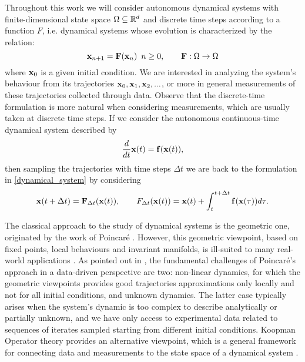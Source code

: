 Throughout this work we will consider autonomous dynamical systems with finite-dimensional state space $\Omega\subseteq\mathbb{R}^d$ and discrete time steps according to a function $F$, i.e. dynamical systems whose evolution is characterized by the relation:
\begin{equation}
    \label{dynamical_system}
    \vb{x}_{n+1} = \vb{F}(\vb{x}_n)\,\,\,n\geq 0, \qquad \vb{F}:\Omega \to \Omega
\end{equation}
where $\vb{x}_0$ is a given initial condition. We are interested in analyzing the system's behaviour from its trajectories $\vb{x}_0, \vb{x}_1, \vb{x}_2,...$, or more in general measurements of these trajectories collected through data. Observe that the discrete-time formulation is more natural when considering measurements, which are usually taken at discrete time steps. If we consider the autonomous continuous-time dynamical system described by
\begin{equation*}
    \frac{d}{dt}\vb{x}(t) = \vb{f}(\vb{x}(t)),
\end{equation*}
then sampling the trajectories with time steps $\Delta t$ we are back to the formulation in \eqref{dynamical_system} by considering
\begin{equation}
    \label{continuous_to_discrete}
    \vb{x}(t+\Delta t) = \vb{F}_{\Delta t}(\vb{x}(t)), \qquad \vb\vb{F}_{\Delta t}(\vb{x}(t)) = \vb{x}(t) + \int_{t}^{t+\Delta t}{\vb{f}(\vb{x}(\tau)) d\tau}.
\end{equation}

The classical approach to the study of dynamical systems is the geometric one, originated by the work of Poincaré \cite{henri_poincare_les_1899}. However, this geometric viewpoint, based on fixed points, local behaviours and invariant manifolds, is ill-suited to many real-world applications \cite{budisic_applied_2012}. As pointed out in \cite{colbrook_rigorous_2021}, the fundamental challenges of Poincaré's approach in a data-driven perspective are two: non-linear dynamics, for which the geometric viewpoints provides good trajectories approximations only locally and not for all initial conditions, and unknown dynamics. The latter case typically arises when the system's dynamic is too complex to describe analytically or partially unknown, and we have only access to experimental data related to sequences of iterates sampled starting from different initial conditions. Koopman Operator theory \cite{koopman_dynamical_1932, koopman_hamiltonian_1931} provides an alternative viewpoint, which is a general framework for connecting data and measurements to the state space of a dynamical system \cite{arbabi_introduction_nodate}.

